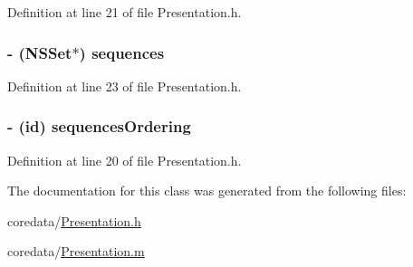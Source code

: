 Definition at line 21 of file Presentation.h.

\hypertarget{interface_presentation_a4cb3c561b838983ae43c00bf45aa2059}{
\subsubsection[{sequences}]{\setlength{\rightskip}{0pt plus 5cm}-\/ (NSSet$\ast$) sequences}}
\label{interface_presentation_a4cb3c561b838983ae43c00bf45aa2059}


Definition at line 23 of file Presentation.h.

\hypertarget{interface_presentation_a818c2c185bddd9433ff9ea8fcdd218a0}{
\subsubsection[{sequencesOrdering}]{\setlength{\rightskip}{0pt plus 5cm}-\/ (id) sequencesOrdering}}
\label{interface_presentation_a818c2c185bddd9433ff9ea8fcdd218a0}


Definition at line 20 of file Presentation.h.



The documentation for this class was generated from the following files:\begin{DoxyCompactItemize}
\item 
coredata/\hyperlink{_presentation_8h}{Presentation.h}\item 
coredata/\hyperlink{_presentation_8m}{Presentation.m}\end{DoxyCompactItemize}
